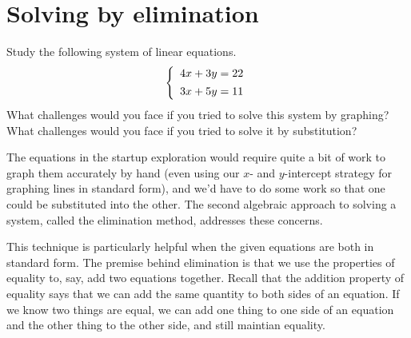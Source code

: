 %
%
%

\section{Solving by elimination}
\label{sec:syselimination}

\begin{boxedexplore}
Study the following system of linear equations.
\[\twosystem{4x+3y=22}{3x+5y=11}\]
What challenges would you face if you tried to solve this system by graphing? What challenges would you face if you tried to solve it by substitution?
\end{boxedexplore}

The equations in the startup exploration would require quite a bit of work to graph them accurately by hand (even using our $x$- and $y$-intercept strategy for graphing lines in standard form), and we'd have to do some work so that one could be substituted into the other. The second algebraic approach to solving a system, called the \gls{elimination method}, addresses these concerns.

This technique is particularly helpful when the given equations are both in standard form. The premise behind elimination is that we use the properties of equality to, say, add two equations together. Recall that the addition property of equality says that we can add the same quantity to both sides of an equation. If we know two things are equal, we can add one thing to one side of an equation and the other thing to the other side, and still maintian equality.

